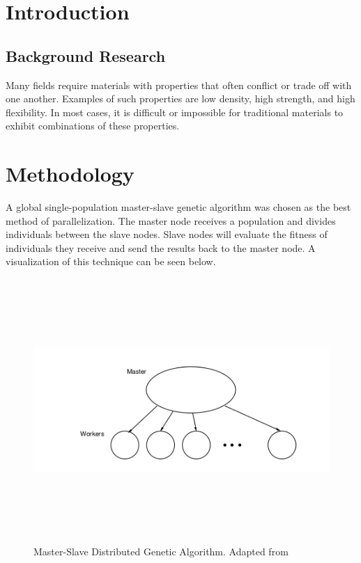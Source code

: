 \documentclass[letterpaper, 12pt]{article}
\begin{document}
\begin{flushleft}

\section*{Introduction}

\subsection*{Background Research}
Many fields require materials with properties that often conflict or trade off with one another.  Examples of such properties are low density, high strength, and high flexibility.  In most cases, it is difficult or impossible for traditional materials to exhibit combinations of these properties.

\section*{Methodology}
 A global single-population master-slave genetic algorithm was chosen as the best method of parallelization. The master node receives a population and divides individuals between the slave nodes.  Slave nodes will evaluate the fitness of individuals they receive and send the results back to the master node.  A visualization of this technique can be seen below.
 
 \begin{figure}[H]
 	\includegraphics[width=\linewidth,height=10cm,keepaspectratio]{model.png}
 	\caption[Master-Slave Genetic Algorithm Implementation]{Master-Slave Distributed Genetic Algorithm. Adapted from \cite{cantu1998survey}}
 	\label{fig:arch}
 \end{figure}


\end{flushleft}
\end{document}

